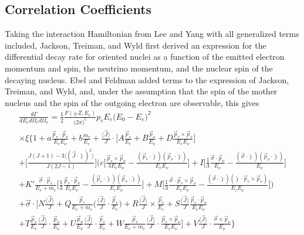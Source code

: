 \subsection{Correlation Coefficients} \label{ssec:correlations}
Taking the interaction Hamiltonian from Lee and Yang with all generalized terms included,
Jackson, Treiman, and Wyld \cite{jackson1957a,jackson1957b} first derived an expression
for the differential decay rate for oriented nuclei as a function of the emitted electron momentum
and spin, the neutrino momentum, and the nuclear spin of the decaying nucleus.
Ebel and Feldman \cite{ebel1957} added terms to the expression of Jackson, Treiman, and Wyld,
and, under the assumption that the spin of the mother nucleus and the spin of the outgoing electron
are observable, this gives
%
\begin{multline}
  \frac{d\Gamma}{dE_e d\Omega_e d\Omega_\nu} = \frac{1}{2} \frac{F(\pm Z, E_e)}{\big( 2\pi \big)^5}
  p_e E_e \big( E_0 - E_e \big)^2 \\ \times \xi 
  \Bigg\{ 1 + a\frac{\vec{p}_e \cdot \vec{p}_\nu}{E_e E_\nu} + b\frac{m_e}{E_e} 
  + \frac{\langle\vec{ J }\rangle}{J} \cdot \Bigg[ A\frac{\vec{p}_e}{E_e}
    + B\frac{\vec{p}_\nu}{E_\nu} + D\frac{\vec{p}_e \times \vec{p}_\nu}{E_e E_\nu}\Bigg] \\
  + \Bigg[ \frac{J(J+1)-3\langle (\vec{J} \cdot \hat{\jmath})^2 \rangle}{J(2J-1)} \Bigg]
  \Bigg( c\Bigg[ \frac{\vec{p}_e \times \vec{p}_\nu}{3E_eE_\nu} -
    \frac{(\vec{p}_e \cdot \hat{\jmath})(\vec{p}_\nu \cdot \hat{\jmath}) }{E_eE_\nu} \Bigg]
  + I \Bigg[ \frac{1}{3}\frac{\vec{\sigma} \cdot \vec{p}_\nu}{E_\nu}
    - \frac{(\vec{\sigma} \cdot \hat{\jmath})(\vec{p}_\nu \cdot \hat{\jmath})}{E_\nu} \Bigg] \\
  + K'\frac{\vec{\sigma} \cdot \vec{p}_e}{E_e+m_e} \Bigg[ \frac{1}{3}\frac{\vec{p}_e \cdot \vec{p}_\nu}{E_e E_\nu}
    - \frac{(\vec{p}_e \cdot \hat{\jmath})(\vec{p}_\nu \cdot \hat{\jmath})}{E_e E_\nu} \Bigg] 
  + M \Bigg[ \frac{1}{3}\frac{\vec{\sigma} \cdot \vec{p}_e \times \vec{p}_\nu}{E_e E_\nu}
    - \frac{(\vec{\sigma} \cdot \hat{\jmath})(\hat{\jmath} \cdot \vec{p}_e \times \vec{p}_\nu )}{E_e E_\nu} \Bigg] \Bigg) \\
  + \vec{\sigma} \cdot \Bigg[ N\frac{\langle \vec{J} \rangle}{J}
    + Q\frac{\vec{p}_e}{E_e+m_e}\Bigg(\frac{\langle \vec{J} \rangle}{J} \cdot \frac{\vec{p}_e}{E_e}\Bigg)
    + R\frac{\langle \vec{J} \rangle}{J} \times \frac{\vec{p}_e}{E_e}
    + S\frac{\langle \vec{J} \rangle}{J} \frac{\vec{p}_e\cdot \vec{p}_\nu}{E_e E_\nu} \\
    + T\frac{\vec{p}_e}{E_e}\frac{\langle \vec{J} \rangle}{J} \cdot \frac{\vec{p}_\nu}{E_\nu}
    + U\frac{\vec{p}_\nu}{E_\nu}\frac{\langle \vec{J} \rangle}{J} \cdot \frac{\vec{p}_e}{E_e}
    + W\frac{\vec{p}_e}{E_e+m_e}\frac{\langle \vec{J} \rangle}{J} \cdot \frac{\vec{p}_e \times \vec{p}_\nu}{E_e E_\nu}
    \Bigg]
  + V\frac{\langle \vec{J} \rangle}{J} \cdot \frac{\vec{\sigma} \times \vec{p}_\nu}{E_\nu}
  \Bigg\}
  \label{eq:jackson}
\end{multline}
